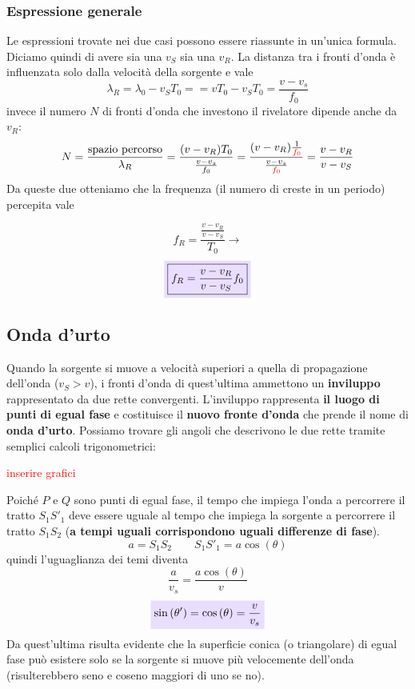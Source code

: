 \documentclass[x11names]{article}
\newcommand{\viola}[1]{\colorbox{myred}{$\displaystyle #1$}}
\begin{document}
		\subsubsection{Espressione generale}
	Le espressioni trovate nei due casi possono essere riassunte in un'unica formula. Diciamo quindi di avere sia una \(v_S\) sia una \(v_R\). La distanza tra i fronti d'onda è influenzata solo dalla velocità della sorgente e vale
	\[ 
	\lambda_R = \lambda_0 - v_ST_0 = = vT_0 - v_ST_0 = \frac{v - v_s}{f_0}
	\]
	invece il numero \(N\) di fronti d'onda che investono il rivelatore dipende anche da \(v_R\):
	\[ 
	N = \frac{\text{spazio percorso}}{\lambda_R} = \frac{(v - v_R)T_0}{\frac{v - v_s}{f_0}} = \frac{(v - v_R)\frac{1}{\textcolor{red}{f_0}}}{\frac{v - v_s}{\textcolor{red}{f_0}}} = \frac{v - v_R}{v - v_S}
	\]
	Da queste due otteniamo che la frequenza (il numero di creste in un periodo) percepita vale
	
	\[ 
	f_R = \frac{\frac{v - v_R}{v-v_S}}{T_0} \to
	\]
	\begin{equation}
		  \viola{\boxed{f_R = \frac{v - v_R}{v-v_S}f_0}}
	\end{equation}

	\subsection{Onda d'urto}
	Quando la sorgente si muove a velocità superiori a quella di propagazione dell'onda (\(v_S > v\)), i fronti d'onda di quest'ultima ammettono un \textbf{inviluppo} rappresentato da due rette convergenti. L'inviluppo rappresenta \textbf{il luogo di punti di egual fase} e costituisce il  \textbf{nuovo fronte d'onda} che prende il nome di \textbf{onda d'urto}. Possiamo trovare gli angoli che descrivono le due rette tramite semplici calcoli trigonometrici: 
	\begin{center}
		\textcolor{red}{inserire grafici}
	\end{center}
	Poiché \(P\) e \(Q\) sono punti di egual fase, il tempo che impiega l'onda a percorrere il tratto \(S_1S'_1\) deve essere uguale al tempo che impiega la sorgente a percorrere il tratto \(S_1S_2\) (\textbf{a tempi uguali corrispondono uguali differenze di fase}).
	\[ 
	\boxed{a = S_1S_2} \qquad \boxed{S_1S'_1 = a\cos\left(\theta\right)}
	\]
	quindi l'uguaglianza dei temi diventa
	\[ 
	\frac{a}{v_s} = \frac{a\cos\left(\theta\right)}{v}
	\]
	\begin{equation}
		\viola{\sin\left(\theta'\right) = \cos\left(\theta\right) = \frac{v}{v_s} }
	\end{equation}
	Da quest'ultima risulta evidente che la superficie conica (o triangolare) di egual fase può esistere solo se la sorgente si muove più velocemente dell'onda (risulterebbero seno e coseno maggiori di uno se no).
	
\end{document}
